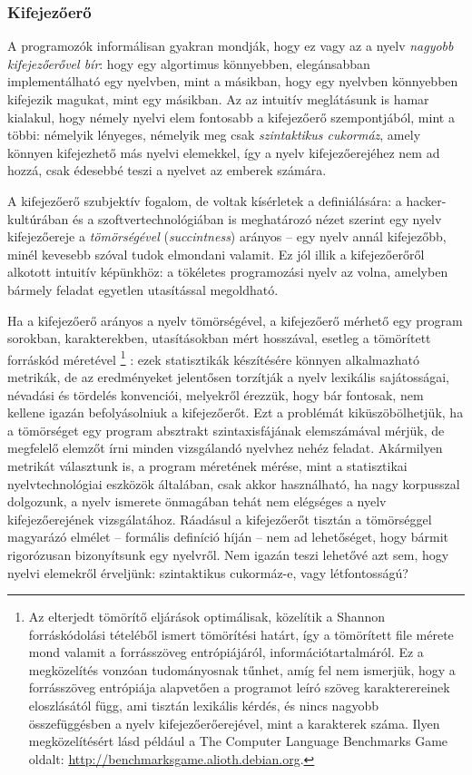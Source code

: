 \subsubsection{Kifejezőerő}
A programozók informálisan gyakran mondják, hogy ez vagy az a nyelv \textit{nagyobb kifejezőerővel bír}: hogy egy algortimus könnyebben, elegánsabban implementálható egy nyelvben, mint a másikban, hogy egy nyelvben könnyebben kifejezik magukat, mint egy másikban.
Az az intuitív meglátásunk is hamar kialakul, hogy némely nyelvi elem fontosabb a kifejezőerő szempontjából, mint a többi: némelyik lényeges, némelyik meg csak \textit{szintaktikus cukormáz}, amely könnyen kifejezhető más nyelvi elemekkel, így a nyelv kifejezőerejéhez nem ad hozzá, csak édesebbé teszi a nyelvet az emberek számára.\cite{Landin64}

A kifejezőerő szubjektív fogalom, de voltak kísérletek a definiálására: a hacker-kultúrában\cite{Graham02} és a szoftvertechnológiában\cite{MythManMonth}\cite{CodeComplete} is meghatározó nézet szerint egy nyelv kifejezőereje a \textit{tömörségével} (\textit{succintness}) arányos -- egy nyelv annál kifejezőbb, minél kevesebb szóval tudok elmondani valamit.
Ez jól illik a kifejezőerőről alkotott intuitív képünkhöz: a tökéletes programozási nyelv az volna, amelyben bármely feladat egyetlen utasítással megoldható.

Ha a kifejezőerő arányos a nyelv tömörségével, a kifejezőerő mérhető egy program sorokban, karakterekben, utasításokban mért hosszával, esetleg a tömörített forráskód méretével%
\footnote{%
Az elterjedt tömörítő eljárások optimálisak, közelítik a Shannon forráskódolási tételéből ismert tömörítési határt, így a tömörített file mérete mond valamit a forrásszöveg entrópiájáról, információtartalmáról.
Ez a megközelítés vonzóan tudományosnak tűnhet, amíg fel nem ismerjük, hogy a forrásszöveg entrópiája alapvetően a programot leíró szöveg karakterereinek eloszlásától függ, ami tisztán lexikális kérdés, és nincs nagyobb összefüggésben a nyelv kifejezőerőerejével, mint a karakterek száma.
Ilyen megközelítésért lásd például a The Computer Language Benchmarks Game oldalt: \url{http://benchmarksgame.alioth.debian.org}.
}%
: ezek statisztikák készítésére könnyen alkalmazható metrikák, de az eredményeket jelentősen torzítják a nyelv lexikális sajátosságai, névadási és tördelés konvenciói, melyekről érezzük, hogy bár fontosak, nem kellene igazán befolyásolniuk a kifejezőerőt.
Ezt a problémát kiküszöbölhetjük, ha a tömörséget egy program absztrakt szintaxisfájának elemszámával mérjük, de megfelelő elemzőt írni minden vizsgálandó nyelvhez nehéz feladat.
Akármilyen metrikát választunk is, a program méretének mérése, mint a statisztikai nyelvtechnológiai eszközök általában, csak akkor használható, ha nagy korpusszal dolgozunk, a nyelv ismerete önmagában tehát nem elégséges a nyelv kifejezőerejének vizsgálatához.
Ráadásul a kifejezőerőt tisztán a tömörséggel magyarázó elmélet -- formális definíció híján -- nem ad lehetőséget, hogy bármit rigorózusan bizonyítsunk egy nyelvről.
Nem igazán teszi lehetővé azt sem, hogy nyelvi elemekről érveljünk: szintaktikus cukormáz-e, vagy létfontosságú?

